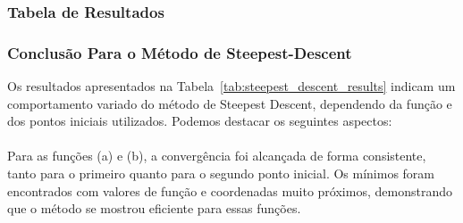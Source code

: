 \documentclass[a4paper, 12pt]{article}
\begin{document}
\subsubsection{Tabela de Resultados}

\begin{table}[H]
    \centering
    \caption{Resultados do Método de Steepest Descent para cada Função}
    \label{tab:steepest_descent_results}
\end{table}

\subsubsection{Conclusão Para o Método de Steepest-Descent}

Os resultados apresentados na Tabela~\ref{tab:steepest_descent_results} indicam um comportamento variado do método de Steepest Descent, dependendo da função e dos pontos iniciais utilizados. Podemos destacar os seguintes aspectos:\\

\\
Para as funções (a) e (b), a convergência foi alcançada de forma consistente, tanto para o primeiro quanto para o segundo ponto inicial. Os mínimos foram encontrados com valores de função e coordenadas muito próximos, demonstrando que o método se mostrou eficiente para essas funções. \\
\end{document}
